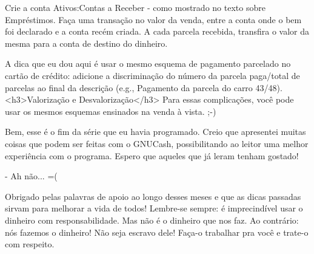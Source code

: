 Crie a conta Ativos:Contas a Receber - como mostrado no texto sobre Empréstimos. Faça uma transação no valor da venda, entre a conta onde o bem foi declarado e a conta recém criada. A cada parcela recebida, transfira o valor da mesma para a conta de destino do dinheiro.

A dica que eu dou aqui é usar o mesmo esquema de pagamento parcelado no cartão de crédito: adicione a discriminação do número da parcela paga/total de parcelas ao final da descrição (e.g., Pagamento da parcela do carro 43/48).
<h3>Valorização e Desvalorização</h3>
Para essas complicações, você pode usar os mesmos esquemas ensinados na venda à vista. ;-)

Bem, esse é o fim da série que eu havia programado. Creio que apresentei muitas coisas que podem ser feitas com o GNUCash, possibilitando ao leitor uma melhor experiência com o programa. Espero que aqueles que já leram tenham gostado!

- Ah não... =(

Obrigado pelas palavras de apoio ao longo desses meses e que as dicas passadas sirvam para melhorar a vida de todos! Lembre-se sempre: é imprecindível usar o dinheiro com responsabilidade. Mas não é o dinheiro que nos faz. Ao contrário: nós fazemos o dinheiro! Não seja escravo dele! Faça-o trabalhar pra você e trate-o com respeito.
